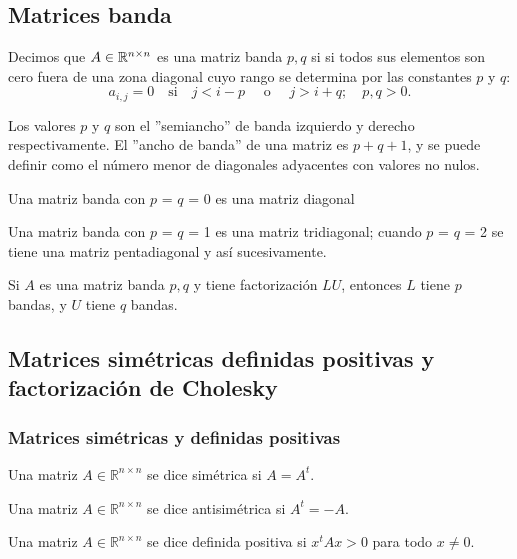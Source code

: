 \subsection{Matrices banda}

Decimos que $A \in\mathbb{R}^{n\times n}$ es una matriz banda $p,q$ si si todos sus elementos
son cero fuera de una zona diagonal cuyo rango se determina por las constantes $p$ y $q$:
$$a_{i,j}=0 \quad \text{si}\quad j<i-p \quad\text{ o }\quad j>i+q; \quad p, q > 0.$$

Los valores $p$ y $q$ son el ''semiancho'' de banda izquierdo y derecho respectivamente. El ''ancho de banda'' de una matriz es $p + q + 1$, y se puede definir como el número menor de diagonales adyacentes con valores no nulos.

Una matriz banda con $p$ = $q$ = 0 es una matriz diagonal

Una matriz banda con $p$ = $q$ = 1 es una matriz tridiagonal; cuando $p$ = $q$ = 2 se tiene una matriz pentadiagonal y así sucesivamente.

\begin{obs}
	Si $A$ es una matriz banda $p,q$ y tiene factorización $LU$, entonces
	$L$ tiene $p$ bandas, y $U$ tiene $q$ bandas.
\end{obs}

\subsection{Matrices simétricas definidas positivas y factorización de Cholesky}

\subsubsection{Matrices simétricas y definidas positivas}

\begin{defi}
Una matriz $A \in \mathbb{R}^{n \times n}$ se dice simétrica si $A = A^t$.
\end{defi}

\begin{defi}
Una matriz $A \in \mathbb{R}^{n \times n}$ se dice antisimétrica si $A^t = -A$.
\end{defi}

\begin{defi}
Una matriz $A \in \mathbb{R}^{n \times n}$ se dice definida positiva si $x^tAx > 0$ para todo $x \neq 0$.
\end{defi}

